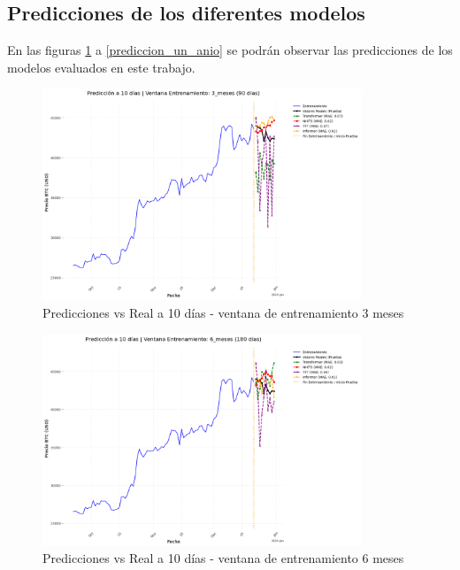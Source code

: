 \documentclass[12pt]{article}
\begin{document}
\subsection{Predicciones de los diferentes modelos}

En las figuras \ref{prediccion_tres_meses} a \ref{prediccion_un_anio} se podrán observar las predicciones de los modelos evaluados en este trabajo.

\begin{figure}[H] 
\centering
\includegraphics[width=0.85\textwidth]{./results/prediccion_10_dias_ventana_3_meses.png} 
\caption{Predicciones vs Real a 10 días - ventana de entrenamiento 3 meses}
\label{prediccion_tres_meses}
\end{figure}

\begin{figure}[H]
\centering
\includegraphics[width=0.85\textwidth]{./results/prediccion_10_dias_ventana_6_meses.png} 
\caption{Predicciones vs Real a 10 días - ventana de entrenamiento 6 meses}
\label{prediccion_seis_meses}
\end{figure}
\end{document}

